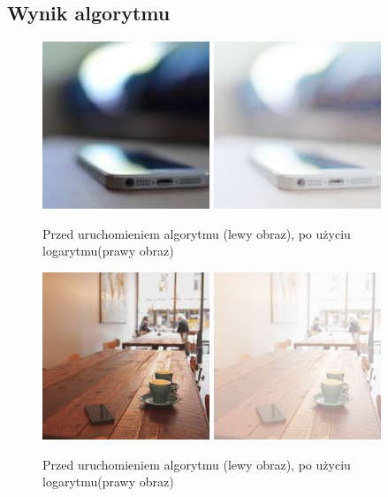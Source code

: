\documentclass[a4paper,12pt]{book}
\begin{document}
\subsection*{Wynik algorytmu}
\begin{figure}[H]
	\caption{Przed uruchomieniem algorytmu (lewy obraz), po użyciu logarytmu(prawy obraz)}
	\includegraphics[width=5cm, height=5cm]{phone-unmodified.jpg}
	\includegraphics[width=5cm, height=5cm]{3-7/logarithm-color-phone.png}
\end{figure}
\begin{figure}[H]
	\caption{Przed uruchomieniem algorytmu (lewy obraz), po użyciu logarytmu(prawy obraz)}
	\includegraphics[width=5cm, height=5cm]{coffee-unmodified.jpg}
	\includegraphics[width=5cm, height=5cm]{3-7/logarithm-color-coffee.png}
\end{figure}
\end{document}
